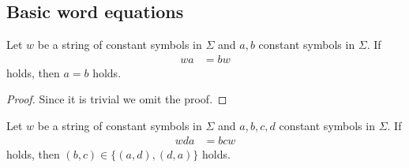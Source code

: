 \subsection{Basic word equations}\label{subsec:basiceq}

\newcommand{\pair}[2]{(#1,#2)}

\begin{prop}\label{prop:repstring_origin}
  Let $w$ be a string of constant symbols in $\Sigma$ and $a,b$ constant symbols in $\Sigma$.
  If
  \begin{align}
  wa & = bw\label{eq:repstring_origin}
  \end{align}
  holds, then $a = b$ holds.
\end{prop}

\begin{proof}
Since it is trivial we omit the proof.
\end{proof}

\begin{prop}\label{prop:repstring_base}
Let $w$ be a string of constant symbols in $\Sigma$ and $a,b,c,d$ constant symbols in $\Sigma$.
If
\begin{align}
wda & = bcw\label{eq:repstring_base}
\end{align}
holds, then $\pair{b}{c} \in \{\pair{a}{d}, \pair{d}{a}\}$ holds.
\end{prop}

